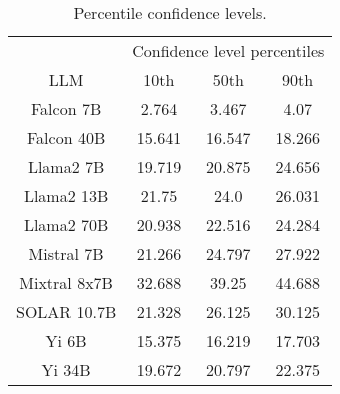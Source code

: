 \begin{table*}
\centering
\begin{tabular}{c|c|c|c}
& \multicolumn{3}{c}{Confidence level percentiles} \\ 
LLM & 10th & 50th & 90th\\ \hline
Falcon 7B & 2.764 & 3.467 & 4.07\\
Falcon 40B & 15.641 & 16.547 & 18.266\\
Llama2 7B & 19.719 & 20.875 & 24.656\\
Llama2 13B & 21.75 & 24.0 & 26.031\\
Llama2 70B & 20.938 & 22.516 & 24.284\\
Mistral 7B & 21.266 & 24.797 & 27.922\\
Mixtral 8x7B & 32.688 & 39.25 & 44.688\\
SOLAR 10.7B & 21.328 & 26.125 & 30.125\\
Yi 6B & 15.375 & 16.219 & 17.703\\
Yi 34B & 19.672 & 20.797 & 22.375\\
\hline
\end{tabular}
\caption{Percentile confidence levels.}
\label{tab:percentile_conf}
\end{table*}
